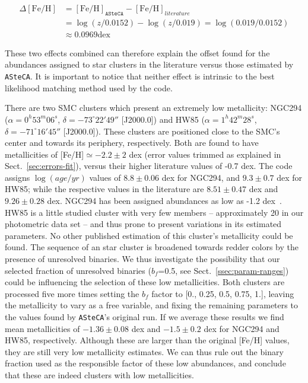 \documentclass{aa}
\begin{document}
\begin{equation}
\begin{split}
\Delta\mathrm{[Fe/H]} & = \mathrm{[Fe/H]}_{\mathtt{ASteCA}} -
\mathrm{[Fe/H]}_{literature} \\
& = \log(z/0.0152) - \log(z/0.019) = \log(0.019/0.0152) \\
& \approx 0.0969 \mathrm{dex}
\end{split}
\label{eq:delta_feh}
\end{equation}

\noindent These two effects combined can therefore explain the offset found
for the abundances assigned to star clusters in the literature versus those
estimated by \texttt{ASteCA}. It is important to notice that neither effect is
intrinsic to the best likelihood matching method used by the code.

%
There are two SMC clusters which present an extremely low metallicity: NGC294
($\alpha{=}0^h53^m06^s$, $\delta{=}-73^\circ22'49''$ [J2000.0]) and
HW85 ($\alpha{=}1^h42^m28^s$, $\delta{=}-71^\circ16'45''$ [J2000.0]). These
clusters are positioned close to the SMC's center and towards its periphery,
respectively.
Both are found to have metallicities of [Fe/H]${\simeq-}2.2{\pm}2$ dex (error
values trimmed as explained in Sect.~\ref{sec:errors-fit}), versus their higher
literature values of -0.7 dex.
The code assigns $\log(age/yr)$ values of $8.8{\pm}0.06$ dex for NGC294, and
$9.3{\pm}0.7$ dex for HW85; while the respective values in the literature are
$8.51{\pm}0.47$ dex and $9.26{\pm}0.28$ dex.
%
NGC294 has been assigned abundances as low as -1.2 dex~\citep[see the
integrated spectroscopy study by][]{Dias_2010}. HW85 is a little studied cluster
with very few members -- approximately 20 in our photometric data set -- and
thus prone to present variations in its estimated parameters. No other
published estimation of this cluster's metallicity could be found.
%
The sequence of an star cluster is broadened towards redder colors by the
presence of unresolved binaries. We thus investigate the possibility that our
selected fraction of unresolved binaries ($b_f$=0.5, see
Sect.~\ref{ssec:param-ranges}) could be influencing the selection of these low
metallicities. Both clusters are processed five more times setting the $b_f$
factor to [0., 0.25, 0.5, 0.75, 1.], leaving the metallicity to vary as a free
variable, and fixing the remaining parameters to the values found by
\texttt{ASteCA}'s original run.
If we average these results we find mean metallicities of  $-1.36{\pm}0.08$ dex
and $-1.5{\pm}0.2$ dex for NGC294 and HW85, respectively.
Although these are larger than the original [Fe/H] values, they are still
very low metallicity estimates. We can thus rule out the binary fraction used as
the responsible factor of these low abundances, and conclude that these are
indeed clusters with low metallicities.
\end{document}
